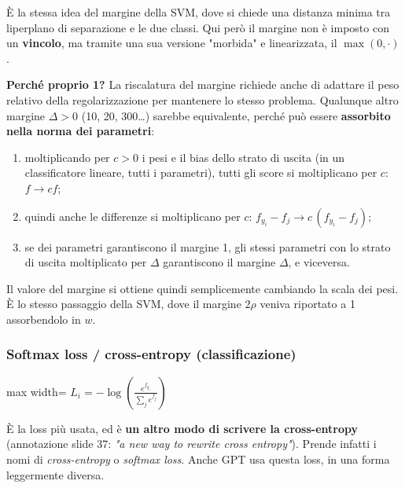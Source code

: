 \documentclass[11pt,a4paper,oneside,openany]{book}
\providecommand{\tightlist}{\setlength{\itemsep}{0pt}\setlength{\parskip}{0pt}}
\begin{document}
È la stessa idea del margine della SVM, dove si chiede una distanza minima tra l\textquotesingle iperplano di separazione e le due classi. Qui però il margine non è imposto con un \textbf{vincolo}, ma tramite una sua versione "morbida" e linearizzata, il \(\max(0,\cdot)\).

\textbf{Perché proprio 1?} La riscalatura del margine richiede anche di adattare il peso relativo della regolarizzazione per mantenere lo stesso problema. Qualunque altro margine \(\Delta > 0\) (10, 20, 300\ldots) sarebbe equivalente, perché può essere \textbf{assorbito nella norma dei parametri}:

\begin{enumerate}
\def\labelenumi{\arabic{enumi}.}
\tightlist
\item
  moltiplicando per \(c > 0\) i pesi e il bias dello strato di uscita (in un classificatore lineare, tutti i parametri), tutti gli score si moltiplicano per \(c\): \(f \to c f\);
\item
  quindi anche le differenze si moltiplicano per \(c\): \(f_{y_i} - f_j \to c\,(f_{y_i} - f_j)\);
\item
  se dei parametri garantiscono il margine 1, gli stessi parametri con lo strato di uscita moltiplicato per \(\Delta\) garantiscono il margine \(\Delta\), e viceversa.
\end{enumerate}

Il valore del margine si ottiene quindi semplicemente cambiando la scala dei pesi. È lo stesso passaggio della SVM, dove il margine \(2\rho\) veniva riportato a 1 assorbendolo in \(w\).

\subsubsection{Softmax loss / cross-entropy (classificazione)}\label{f01-r619}

\begin{center}
\begin{adjustbox}{max width=\linewidth}
$\displaystyle 
\boxed{L_i = -\log\left(\frac{e^{f_{y_i}}}{\sum_j e^{f_j}}\right)}
$
\end{adjustbox}
\end{center}

È la loss più usata, ed è \textbf{un altro modo di scrivere la cross-entropy} (annotazione slide 37: \emph{"a new way to rewrite cross entropy"}). Prende infatti i nomi di \emph{cross-entropy} o \emph{softmax loss}. Anche GPT usa questa loss, in una forma leggermente diversa.
\end{document}
